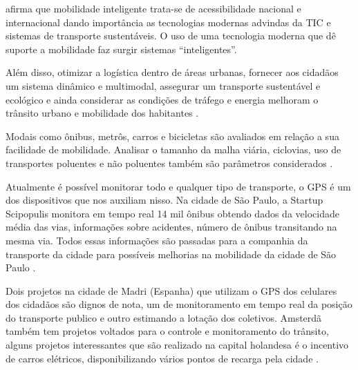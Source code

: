 

 afirma que mobilidade inteligente trata-se de acessibilidade nacional e internacional dando importância as tecnologias modernas advindas da TIC e sistemas de transporte sustentáveis. O uso de uma tecnologia moderna que dê suporte a mobilidade faz surgir sistemas “inteligentes”.

Além disso, otimizar a logística dentro de áreas urbanas, fornecer aos cidadãos um sistema dinâmico e multimodal, assegurar um transporte sustentável e ecológico e ainda considerar as condições de tráfego e energia melhoram o trânsito urbano e mobilidade dos habitantes \cite{neirotti}. %

Modais como ônibus, metrôs, carros e bicicletas são avaliados em relação a sua facilidade de mobilidade. Analisar o tamanho da malha viária, ciclovias, uso de transportes poluentes e não poluentes também são parâmetros considerados \cite{kon}. 


Atualmente é possível monitorar todo e qualquer tipo de transporte, o GPS é um dos dispositivos que nos auxiliam nisso. Na cidade de São Paulo, a Startup Scipopulis monitora em tempo real 14 mil ônibus obtendo dados da velocidade média das vias, informações sobre acidentes, número de ônibus transitando na mesma via. Todos essas informações são passadas para a companhia da transporte da cidade para possíveis melhorias na mobilidade da cidade de São Paulo \cite{kon}.

Dois projetos na cidade de Madri (Espanha) que utilizam o GPS dos celulares dos cidadãos são dignos de nota, um de monitoramento em tempo real da posição do transporte publico e outro estimando a lotação dos coletivos. Amsterdã também tem projetos voltados para o controle e monitoramento do trânsito, alguns projetos interessantes que são realizado na capital holandesa é o incentivo de carros elétricos, disponibilizando vários pontos de recarga pela cidade \cite{kon}.



